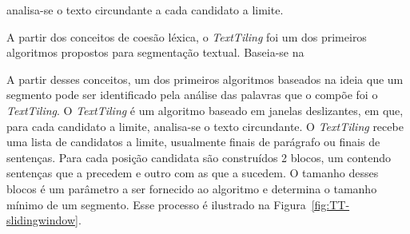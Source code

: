 analisa-se o texto circundante a cada candidato a limite.




A partir dos conceitos de coesão léxica, o \textit{TextTiling} foi um dos primeiros algoritmos propostos para segmentação textual. Baseia-se na

A partir desses conceitos, um dos primeiros algoritmos baseados na ideia que um segmento pode ser identificado pela análise das palavras que o compõe foi o \textit{TextTiling}. O \textit{TextTiling} é um algoritmo baseado em janelas deslizantes, em  que, para cada candidato a limite, analisa-se o texto circundante. O \textit{TextTiling} recebe uma lista de candidatos a limite, usualmente finais de parágrafo ou finais de sentenças. Para cada posição candidata são construídos 2 blocos, um contendo sentenças que a precedem e outro com as que a sucedem. O tamanho desses blocos é um parâmetro a ser fornecido ao algoritmo e determina o tamanho mínimo de um segmento. Esse processo é ilustrado na Figura~\ref{fig:TT-slidingwindow}.






% 












